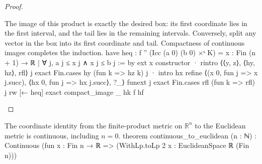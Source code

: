 \begin{proof}
  \begin{lean}{The image of this product is exactly the desired box: its first coordinate lies in the first interval, and the tail lies in the remaining intervals. Conversely, split any vector in the box into its first coordinate and tail. Compactness of continuous images completes the induction.}
    have heq : f '' (Icc (a 0) (b 0) ×ˢ K) =
        {x : Fin (n + 1) → ℝ | ∀ j, a j ≤ x j ∧ x j ≤ b j} := by
      ext x
      constructor
      · rintro ⟨⟨y, z⟩, ⟨hy, hz⟩, rfl⟩ j
        exact Fin.cases hy (fun k => hz k) j
      · intro hx
        refine ⟨(x 0, fun j => x j.succ), ⟨hx 0, fun j => hx j.succ⟩, ?_⟩
        funext j
        exact Fin.cases rfl (fun k => rfl) j
    rw [← heq]
    exact compact_image _ hk f hf
  \end{lean}

\end{proof}

\begin{lemma} \label{an1:lem:continuous-to-euclidean}
  \begin{lean}{The coordinate identity from the finite-product metric on $\mathbb R^n$ to the Euclidean metric is continuous, including $n=0$.}
    theorem continuous_to_euclidean (n : ℕ) :
        Continuous (fun x : Fin n → ℝ => (WithLp.toLp 2 x : EuclideanSpace ℝ (Fin n)))
  \end{lean}
\end{lemma}

